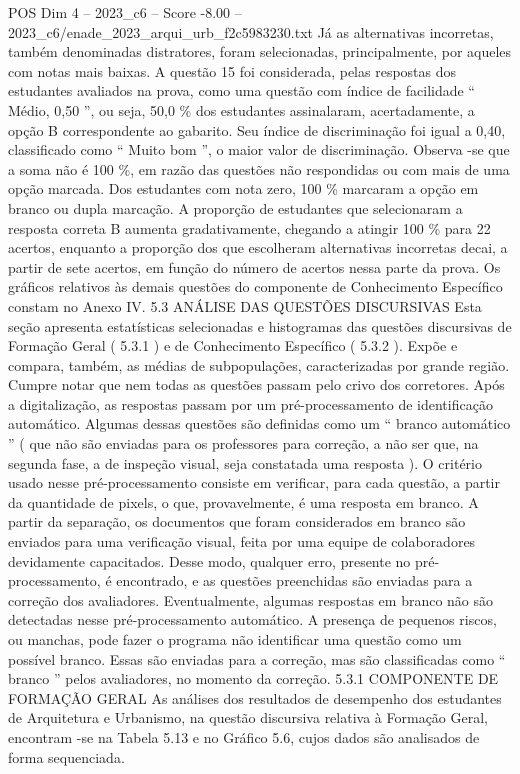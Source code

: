 \begin{textsample}{POS Dim 4 – 2023\_c6 – Score -8.00 – 2023\_c6/enade\_2023\_arqui\_urb\_f2c5983230.txt}
Já as alternativas incorretas, também denominadas distratores, foram selecionadas, principalmente, por aqueles com notas mais baixas.
A questão 15 foi considerada, pelas respostas dos estudantes avaliados na prova, como uma questão com índice de facilidade “ Médio, 0,50 ”, ou seja, 50,0 \% dos estudantes assinalaram, acertadamente, a opção B correspondente ao gabarito.
Seu índice de discriminação foi igual a 0,40, classificado como “ Muito bom ”, o maior valor de discriminação.
Observa -se que a soma não é 100 \%, em razão das questões não respondidas ou com mais de uma opção marcada.
Dos estudantes com nota zero, 100 \% marcaram a opção em branco ou dupla marcação.
A proporção de estudantes que selecionaram a resposta correta B aumenta gradativamente, chegando a atingir 100 \% para 22 acertos, enquanto a proporção dos que escolheram alternativas incorretas decai, a partir de sete acertos, em função do número de acertos nessa parte da prova.
Os gráficos relativos às demais questões do componente de Conhecimento Específico constam no Anexo IV. 5.3 ANÁLISE DAS QUESTÕES DISCURSIVAS Esta seção apresenta estatísticas selecionadas e histogramas das questões discursivas de Formação Geral ( 5.3.1 ) e de Conhecimento Específico ( 5.3.2 ).
Expõe e compara, também, as médias de subpopulações, caracterizadas por grande região.
Cumpre notar que nem todas as questões passam pelo crivo dos corretores.
Após a digitalização, as respostas passam por um pré-processamento de identificação automático.
Algumas dessas questões são definidas como um “ branco automático ” ( que não são enviadas para os professores para correção, a não ser que, na segunda fase, a de inspeção visual, seja constatada uma resposta ).
O critério usado nesse pré-processamento consiste em verificar, para cada questão, a partir da quantidade de pixels, o que, provavelmente, é uma resposta em branco.
A partir da separação, os documentos que foram considerados em branco são enviados para uma verificação visual, feita por uma equipe de colaboradores devidamente capacitados.
Desse modo, qualquer erro, presente no pré-processamento, é encontrado, e as questões preenchidas são enviadas para a correção dos avaliadores.
Eventualmente, algumas respostas em branco não são detectadas nesse pré-processamento automático.
A presença de pequenos riscos, ou manchas, pode fazer o programa não identificar uma questão como um possível branco.
Essas são enviadas para a correção, mas são classificadas como “ branco ” pelos avaliadores, no momento da correção. 5.3.1 COMPONENTE DE FORMAÇÃO GERAL As análises dos resultados de desempenho dos estudantes de Arquitetura e Urbanismo, na questão discursiva relativa à Formação Geral, encontram -se na Tabela 5.13 e no Gráfico 5.6, cujos dados são analisados de forma sequenciada.

\end{textsample}
